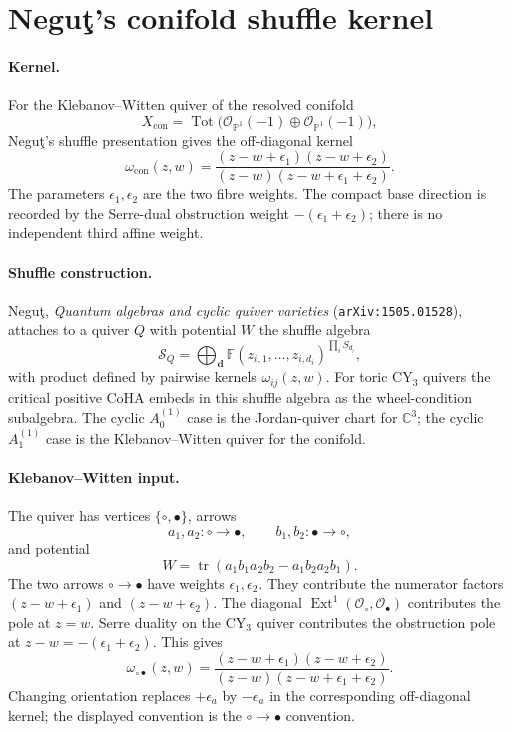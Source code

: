 \providecommand{\CoHA}{\mathrm{CoHA}}

\section*{Negu\c{t}'s conifold shuffle kernel}
\label{sec:negut-conifold-kernel}

\paragraph{Kernel.}
For the Klebanov--Witten quiver of the resolved conifold
\[
  X_{\mathrm{con}}=\operatorname{Tot}\bigl(\mathcal O_{\mathbb P^1}(-1)
  \oplus \mathcal O_{\mathbb P^1}(-1)\bigr),
\]
Negu\c{t}'s shuffle presentation gives the off-diagonal kernel
\[
  \omega_{\mathrm{con}}(z,w)
  =
  \frac{(z-w+\epsilon_1)(z-w+\epsilon_2)}
       {(z-w)(z-w+\epsilon_1+\epsilon_2)}.
\]
The parameters $\epsilon_1,\epsilon_2$ are the two fibre weights.  The
compact base direction is recorded by the Serre-dual obstruction weight
$-(\epsilon_1+\epsilon_2)$; there is no independent third affine weight.

\paragraph{Shuffle construction.}
Negu\c{t}, \emph{Quantum algebras and cyclic quiver varieties}
(\texttt{arXiv:1505.01528}), attaches to a quiver $Q$ with potential
$W$ the shuffle algebra
\[
  \mathcal S_Q
  =
  \bigoplus_{\mathbf d}
  \mathbb F(z_{i,1},\dots,z_{i,d_i})^{\prod_i S_{d_i}},
\]
with product defined by pairwise kernels $\omega_{ij}(z,w)$.  For toric
CY$_3$ quivers the critical positive CoHA embeds in this shuffle algebra
as the wheel-condition subalgebra.  The cyclic $A_0^{(1)}$ case is the
Jordan-quiver chart for $\mathbb C^3$; the cyclic $A_1^{(1)}$ case is
the Klebanov--Witten quiver for the conifold.

\paragraph{Klebanov--Witten input.}
The quiver has vertices $\{\circ,\bullet\}$, arrows
\[
  a_1,a_2:\circ\to\bullet,\qquad
  b_1,b_2:\bullet\to\circ,
\]
and potential
\[
  W=\operatorname{tr}(a_1b_1a_2b_2-a_1b_2a_2b_1).
\]
The two arrows $\circ\to\bullet$ have weights
$\epsilon_1,\epsilon_2$.  They contribute the numerator factors
$(z-w+\epsilon_1)$ and $(z-w+\epsilon_2)$.  The diagonal
$\operatorname{Ext}^1(\mathcal O_\circ,\mathcal O_\bullet)$ contributes
the pole at $z=w$.  Serre duality on the CY$_3$ quiver contributes the
obstruction pole at $z-w=-(\epsilon_1+\epsilon_2)$.  This gives
\[
  \omega_{\circ\bullet}(z,w)
  =
  \frac{(z-w+\epsilon_1)(z-w+\epsilon_2)}
       {(z-w)(z-w+\epsilon_1+\epsilon_2)}.
\]
Changing orientation replaces $+\epsilon_a$ by $-\epsilon_a$ in the
corresponding off-diagonal kernel; the displayed convention is the
$\circ\to\bullet$ convention.

